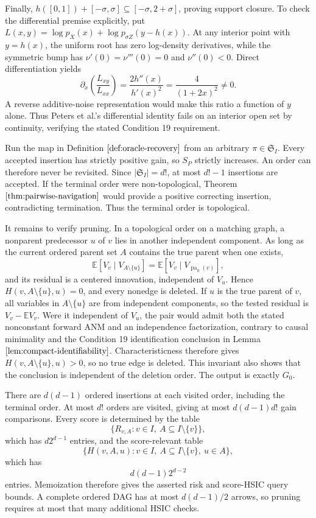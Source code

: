 Finally, \(h([0,1])+[-\sigma,\sigma]\subseteq[-\sigma,2+\sigma]\), proving support closure.  To check the differential premise explicitly, put \(L(x,y)=\log p_X(x)+\log p_{\sigma Z}(y-h(x))\).  At any interior point with \(y=h(x)\), the uniform root has zero log-density derivatives, while the symmetric bump has \(\nu'(0)=\nu'''(0)=0\) and \(\nu''(0)<0\).  Direct differentiation yields
\[
 \partial_x\!\left(\frac{L_{xy}}{L_{xx}}\right)
 =\frac{2h''(x)}{h'(x)^2}=\frac{4}{(1+2x)^2}\ne0.
\]
A reverse additive-noise representation would make this ratio a function of \(y\) alone.  Thus Peters et al.'s differential identity fails on an interior open set by continuity, verifying the stated Condition 19 requirement.

Run the map in Definition \(\ref{def:oracle-recovery}\) from an arbitrary \(\pi\in\mathfrak S_I\).  Every accepted insertion has strictly positive gain, so \(S_P\) strictly increases.  An order can therefore never be revisited.  Since \(|\mathfrak S_I|=d!\), at most \(d!-1\) insertions are accepted.  If the terminal order were non-topological, Theorem \(\ref{thm:pairwise-navigation}\) would provide a positive correcting insertion, contradicting termination.  Thus the terminal order is topological.

It remains to verify pruning.  In a topological order on a matching graph, a nonparent predecessor \(u\) of \(v\) lies in another independent component.  As long as the current ordered parent set \(A\) contains the true parent when one exists,
\[
 \mathbb E[V_v\mid V_{A\setminus\{u\}}]
 =\mathbb E[V_v\mid V_{\operatorname{pa}_0(v)}],
\]
and its residual is a centered innovation, independent of \(V_u\).  Hence \(H(v,A\setminus\{u\},u)=0\), and every nonedge is deleted.  If \(u\) is the true parent of \(v\), all variables in \(A\setminus\{u\}\) are from independent components, so the tested residual is \(V_v-\mathbb E V_v\).  Were it independent of \(V_u\), the pair would admit both the stated nonconstant forward ANM and an independence factorization, contrary to causal minimality and the Condition 19 identification conclusion in Lemma \(\ref{lem:compact-identifiability}\).  Characteristicness therefore gives \(H(v,A\setminus\{u\},u)>0\), so no true edge is deleted.  This invariant also shows that the conclusion is independent of the deletion order.  The output is exactly \(G_0\).

There are \(d(d-1)\) ordered insertions at each visited order, including the terminal order.  At most \(d!\) orders are visited, giving at most \(d(d-1)d!\) gain comparisons.  Every score is determined by the table
\[
 \{R_{v,A}:v\in I,\ A\subseteq I\setminus\{v\}\},
\]
which has \(d2^{d-1}\) entries, and the score-relevant table
\[
 \{H(v,A,u):v\in I,\ A\subseteq I\setminus\{v\},\ u\in A\},
\]
which has
\[
 d(d-1)2^{d-2}
\]
entries.  Memoization therefore gives the asserted risk and score-HSIC query bounds.  A complete ordered DAG has at most \(d(d-1)/2\) arrows, so pruning requires at most that many additional HSIC checks.

